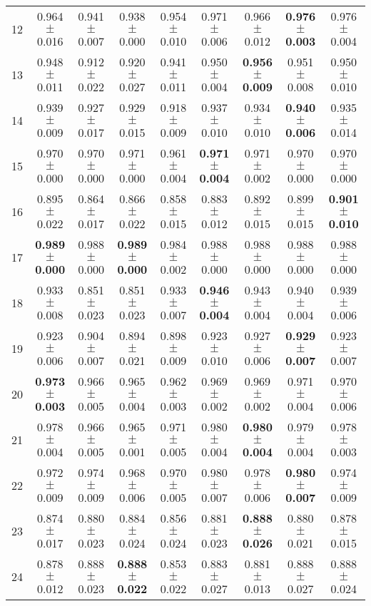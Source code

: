 \begin{table}[!ht]
{\begin{tabular}{r c c c c c c c c}
12 & 0.964 $\pm$ 0.016 & 0.941 $\pm$ 0.007 & 0.938 $\pm$ 0.000 & 0.954 $\pm$ 0.010 & 0.971 $\pm$ 0.006 & 0.966 $\pm$ 0.012 & \textbf{0.976 $\pm$ 0.003} & 0.976 $\pm$ 0.004 \\
13 & 0.948 $\pm$ 0.011 & 0.912 $\pm$ 0.022 & 0.920 $\pm$ 0.027 & 0.941 $\pm$ 0.011 & 0.950 $\pm$ 0.004 & \textbf{0.956 $\pm$ 0.009} & 0.951 $\pm$ 0.008 & 0.950 $\pm$ 0.010 \\
14 & 0.939 $\pm$ 0.009 & 0.927 $\pm$ 0.017 & 0.929 $\pm$ 0.015 & 0.918 $\pm$ 0.009 & 0.937 $\pm$ 0.010 & 0.934 $\pm$ 0.010 & \textbf{0.940 $\pm$ 0.006} & 0.935 $\pm$ 0.014 \\
15 & 0.970 $\pm$ 0.000 & 0.970 $\pm$ 0.000 & 0.971 $\pm$ 0.000 & 0.961 $\pm$ 0.004 & \textbf{0.971 $\pm$ 0.004} & 0.971 $\pm$ 0.002 & 0.970 $\pm$ 0.000 & 0.970 $\pm$ 0.000 \\
16 & 0.895 $\pm$ 0.022 & 0.864 $\pm$ 0.017 & 0.866 $\pm$ 0.022 & 0.858 $\pm$ 0.015 & 0.883 $\pm$ 0.012 & 0.892 $\pm$ 0.015 & 0.899 $\pm$ 0.015 & \textbf{0.901 $\pm$ 0.010} \\
17 & \textbf{0.989 $\pm$ 0.000} & 0.988 $\pm$ 0.000 & \textbf{0.989 $\pm$ 0.000} & 0.984 $\pm$ 0.002 & 0.988 $\pm$ 0.000 & 0.988 $\pm$ 0.000 & 0.988 $\pm$ 0.000 & 0.988 $\pm$ 0.000 \\
18 & 0.933 $\pm$ 0.008 & 0.851 $\pm$ 0.023 & 0.851 $\pm$ 0.023 & 0.933 $\pm$ 0.007 & \textbf{0.946 $\pm$ 0.004} & 0.943 $\pm$ 0.004 & 0.940 $\pm$ 0.004 & 0.939 $\pm$ 0.006 \\
19 & 0.923 $\pm$ 0.006 & 0.904 $\pm$ 0.007 & 0.894 $\pm$ 0.021 & 0.898 $\pm$ 0.009 & 0.923 $\pm$ 0.010 & 0.927 $\pm$ 0.006 & \textbf{0.929 $\pm$ 0.007} & 0.923 $\pm$ 0.007 \\
20 & \textbf{0.973 $\pm$ 0.003} & 0.966 $\pm$ 0.005 & 0.965 $\pm$ 0.004 & 0.962 $\pm$ 0.003 & 0.969 $\pm$ 0.002 & 0.969 $\pm$ 0.002 & 0.971 $\pm$ 0.004 & 0.970 $\pm$ 0.006 \\
21 & 0.978 $\pm$ 0.004 & 0.966 $\pm$ 0.005 & 0.965 $\pm$ 0.001 & 0.971 $\pm$ 0.005 & 0.980 $\pm$ 0.004 & \textbf{0.980 $\pm$ 0.004} & 0.979 $\pm$ 0.004 & 0.978 $\pm$ 0.003 \\
22 & 0.972 $\pm$ 0.009 & 0.974 $\pm$ 0.009 & 0.968 $\pm$ 0.006 & 0.970 $\pm$ 0.005 & 0.980 $\pm$ 0.007 & 0.978 $\pm$ 0.006 & \textbf{0.980 $\pm$ 0.007} & 0.974 $\pm$ 0.009 \\
23 & 0.874 $\pm$ 0.017 & 0.880 $\pm$ 0.023 & 0.884 $\pm$ 0.024 & 0.856 $\pm$ 0.024 & 0.881 $\pm$ 0.023 & \textbf{0.888 $\pm$ 0.026} & 0.880 $\pm$ 0.021 & 0.878 $\pm$ 0.015 \\
24 & 0.878 $\pm$ 0.012 & 0.888 $\pm$ 0.023 & \textbf{0.888 $\pm$ 0.022} & 0.853 $\pm$ 0.022 & 0.883 $\pm$ 0.027 & 0.881 $\pm$ 0.013 & 0.888 $\pm$ 0.027 & 0.888 $\pm$ 0.024 \\

\end{tabular}}
\end{table}
